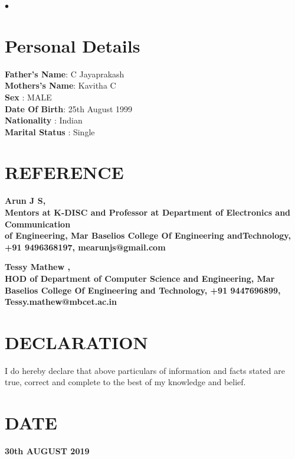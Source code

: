 \documentclass[margin,line]{res}
\newenvironment{list2}{
	\begin{list}{$\bullet$}{%
			\setlength{\itemsep}{0in}
			\setlength{\parsep}{0in} \setlength{\parskip}{0in}
			\setlength{\topsep}{0in} \setlength{\partopsep}{0in}
			\setlength{\leftmargin}{0.2in}}}{\end{list}}
\begin{document}
\begin{resume}
\begin{list2}
\end{list2}
\section{\sc Personal Details}
{\bf Father's Name}:  C Jayaprakash\\
{\bf Mothers's Name}:  Kavitha C\\
{\bf Sex}  :  MALE\\
{\bf Date Of Birth}:  25th August 1999\\
{\bf Nationality}       : Indian \\
{\bf Marital Status}       : Single \\

\section{\sc REFERENCE }

\bf Arun J S,\\ Mentors at K-DISC and
Professor at Department of Electronics and Communication\\ of Engineering, Mar Baselios College Of Engineering andTechnology, +91 9496368197, mearunjs@gmail.com

\bf Tessy Mathew ,\\ HOD of Department of Computer Science and Engineering, Mar Baselios College Of Engineering and Technology, +91 9447696899, Tessy.mathew@mbcet.ac.in

\section{\sc DECLARATION}
I do hereby declare that above particulars of information and facts stated are true, correct and complete to the best of my knowledge and belief.
\section{\sc DATE}
\bf 30th AUGUST 2019
\end{resume}
\end{document}

